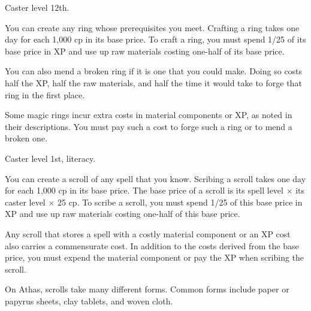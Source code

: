 {Caster level 12th.}
{You can create any ring whose prerequisites you meet. Crafting a ring takes one day for each 1,000 cp in its base price. To craft a ring, you must spend 1/25 of its base price in XP and use up raw materials costing one-half of its base price.

You can also mend a broken ring if it is one that you could make. Doing so costs half the XP, half the raw materials, and half the time it would take to forge that ring in the first place.

Some magic rings incur extra costs in material components or XP, as noted in their descriptions. You must pay such a cost to forge such a ring or to mend a broken one.}



{}
{Caster level 1st, literacy.}
{You can create a scroll of any spell that you know. Scribing a scroll takes one day for each 1,000 cp in its base price. The base price of a scroll is its spell level $\times$ its caster level $\times$ 25 cp. To scribe a scroll, you must spend 1/25 of this base price in XP and use up raw materials costing one-half of this base price.

Any scroll that stores a spell with a costly material component or an XP cost also carries a commensurate cost. In addition to the costs derived from the base price, you must expend the material component or pay the XP when scribing the scroll.}
{}
{On Athas, scrolls take many different forms. Common forms include paper or papyrus sheets, clay tablets, and woven cloth.}


